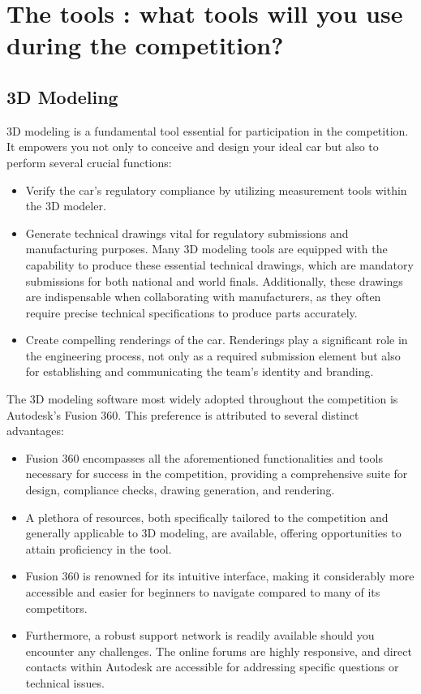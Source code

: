 \chapter{The tools : what tools will you use during the competition?}

\section{3D Modeling}

3D modeling is a fundamental tool essential for participation in the competition. It empowers you not only to conceive and design your ideal car but also to perform several crucial functions: \par
\begin{itemize}
    \item Verify the car's regulatory compliance by utilizing measurement tools within the 3D modeler.
    \item Generate technical drawings vital for regulatory submissions and manufacturing purposes. Many 3D modeling tools are equipped with the capability to produce these essential technical drawings, which are mandatory submissions for both national and world finals. Additionally, these drawings are indispensable when collaborating with manufacturers, as they often require precise technical specifications to produce parts accurately.
    \item Create compelling renderings of the car. Renderings play a significant role in the engineering process, not only as a required submission element but also for establishing and communicating the team's identity and branding.
\end{itemize}

The 3D modeling software most widely adopted throughout the competition is Autodesk's Fusion 360. This preference is attributed to several distinct advantages:

\begin{itemize}
    \item Fusion 360 encompasses all the aforementioned functionalities and tools necessary for success in the competition, providing a comprehensive suite for design, compliance checks, drawing generation, and rendering.
    \item A plethora of resources, both specifically tailored to the competition and generally applicable to 3D modeling, are available, offering opportunities to attain proficiency in the tool. 
    \item Fusion 360 is renowned for its intuitive interface, making it considerably more accessible and easier for beginners to navigate compared to many of its competitors. 
    \item Furthermore, a robust support network is readily available should you encounter any challenges. The online forums are highly responsive, and direct contacts within Autodesk are accessible for addressing specific questions or technical issues.
\end{itemize}

